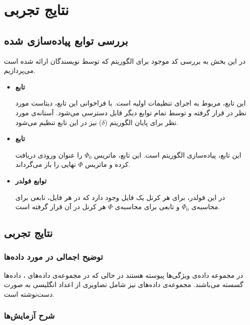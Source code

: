 
\chapter{نتایج تجربی}

\section{بررسی توابع پیاده‌سازی شده}
در این بخش به بررسی کد موجود برای الگوریتم 
که توسط نویسندگان ارائه شده است می‌پردازیم.
\begin{itemize}
	
\item
\textbf{	تابع 
	}

این تابع، مربوط به اجرای تنظیمات اولیه است. با فراخوانی این تابع، دیتاست مورد نظر در 
قرار گرفته و توسط تمام توابع دیگر قابل دسترسی می‌شود. آستانه‌ی مورد نظر برای پایان الگوریتم ($\delta$) نیز در این تابع تنظیم می‌شود.


\item 
\textbf{	تابع 
}
	
این تابع، پیاده‌سازی الگوریتم 
است. این تابع، ماتریس
$\Phi_0$
را عنوان ورودی دریافت کرده و ماتریس
$\Phi$
 نهایی را باز می‌گرداند.
		 
\item 
\textbf{	توابع فولدر 
}


در این فولدر، برای هر کرنل یک فایل وجود دارد که در هر فایل، تابعی برای محاسبه‌ی 
$\Phi_0$
و تابعی برای محاسبه‌ی 
$\Phi$
هر کرنل در آن قرار گرفته است.
		
\end{itemize}



\section{نتایج تجربی}
\subsection{توضیح اجمالی در مورد داده‌ها}
در مجموعه داده‌ی 
ویژگی‌ها پیوسته هستند در حالی که در مجموعه‌ی داده‌های 
،
داده‌ها گسسته می‌باشند.  مجموعه‌ی داده‌های
نیز شامل تصاویری از اعداد انگلیسی به صورت دست‌نوشته است.
\subsection{شرح آزمایش‌ها}

